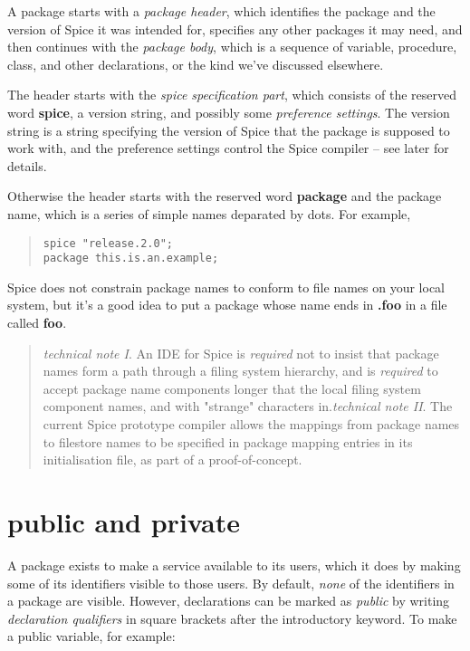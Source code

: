 \documentclass{report}
\begin{document}
A package starts with a {\em package header}, which identifies the package and the
version of Spice it was intended for, specifies any other packages it may need,
and then continues with the {\em package body}, which is a sequence of variable,
procedure, class, and other declarations, or the kind we've discussed
elsewhere.

The header starts with the {\em spice specification part}, which consists of
the reserved word {\bf spice}, a version string, and possibly some {\em preference
settings}. The version string is a string specifying the version of Spice
that the package is supposed to work with, and the preference settings control
the Spice compiler -- see later for details.

Otherwise the header starts with the reserved word {\bf package} and the package
name, which is a series of simple names deparated by dots. For example,

\begin{quote}
\begin{verbatim}
spice "release.2.0";
package this.is.an.example;
\end{verbatim}
\end{quote}


Spice does not constrain package names to conform to file names on your local
system, but it's a good idea to put a package whose name ends in {\bf .foo} in a
file called {\bf foo}.

\begin{quote}{\em technical note I}. An IDE for Spice is {\em required} not to insist that package
names form a path through a filing system hierarchy, and is {\em required} to
accept package name components longer that the local filing system component
names, and with "strange" characters in.{\em technical note II}. The current Spice prototype compiler allows the mappings
from package names to filestore names to be specified in package mapping
entries in its initialisation file, as part of a proof-of-concept.
\end{quote}

\section{public and private}


A package exists to make a service available to its users, which it does by
making some of its identifiers visible to those users. By default, {\em none} of
the identifiers in a package are visible. However, declarations can be marked
as {\em public} by writing {\em declaration qualifiers} in square brackets after
the introductory keyword. To make a public variable, for example:
\end{document}
